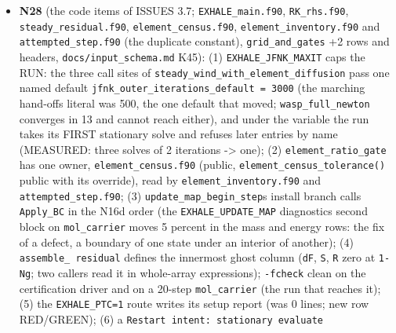\documentclass[english,a4paper]{my_memo}
\begin{document}
\begin{itemize}
  so \texttt{project\_elements} does not return to hydrogen the mass it takes from
  helium (N29, launched); (2) the writer-to-loader round trip does not
  return the state: the atomic candidate reloads at \texttt{\textbar{}\textbar{}R\textbar{}\textbar{}} 0.486 instead of
  3.7e-4 because \texttt{load\_IC} rebuilds \texttt{rho} from the species (a consequence of
  1). Tests 42/0 (RED at the build level: the suite does not compile against
  the entry objects); the default certification report byte-identical
  (anchoring under \texttt{EXHALE\_CERT\_ANCHOR=1}). Advisor: rebuild warning-free,
  \texttt{certification} 42/0; one \texttt{neighborhood} and two \texttt{percent} fixed.
\item
  \textbf{N28} (the code items of ISSUES 3.7; \texttt{EXHALE\_main.f90}, \texttt{RK\_rhs.f90},
  \texttt{steady\_residual.f90}, \texttt{element\_census.f90}, \texttt{element\_inventory.f90} and
  \texttt{attempted\_step.f90} (the duplicate constant), \texttt{grid\_and\_gates} +2 rows and
  headers, \texttt{docs/input\_schema.md} K45): (1) \texttt{EXHALE\_JFNK\_MAXIT} caps the RUN:
  the three call sites of \texttt{steady\_wind\_with\_element\_diffusion} pass one named
  default \texttt{jfnk\_outer\_iterations\_default\ =\ 3000} (the marching hand-off\textquotesingle s
  literal was 500, the one default that moved; \texttt{wasp\_full\_newton} converges
  in 13 and cannot reach either), and under the variable the run takes its
  FIRST stationary solve and refuses later entries by name (MEASURED: three
  solves of 2 iterations -\textgreater{} one); (2) \texttt{element\_ratio\_gate} has one owner,
  \texttt{element\_census.f90} (public, \texttt{element\_census\_tolerance()} public with its
  override), read by \texttt{element\_inventory.f90} and \texttt{attempted\_step.f90}; (3)
  \texttt{update\_map\_begin\_step}\textquotesingle s install branch calls \texttt{Apply\_BC} in the N16d
  order (the \texttt{EXHALE\_UPDATE\_MAP} diagnostic\textquotesingle s second block on \texttt{mol\_carrier}
  moves 5 percent in the mass and energy rows: the fix of a defect, a
  boundary of one state under an interior of another); (4) \texttt{assemble\_\ residual} defines the innermost ghost column (\texttt{dF}, \texttt{S}, \texttt{R} zero at
  \texttt{1-Ng}; two callers read it in whole-array expressions); \texttt{-fcheck} clean
  on the certification driver and on a 20-step \texttt{mol\_carrier} (the run that
  reaches it); (5) the \texttt{EXHALE\_PTC=1} route writes its setup report (was 0
  lines; new row RED/GREEN); (6) a \texttt{Restart\ intent:\ stationary\ evaluate}

\end{itemize}
\end{document}
